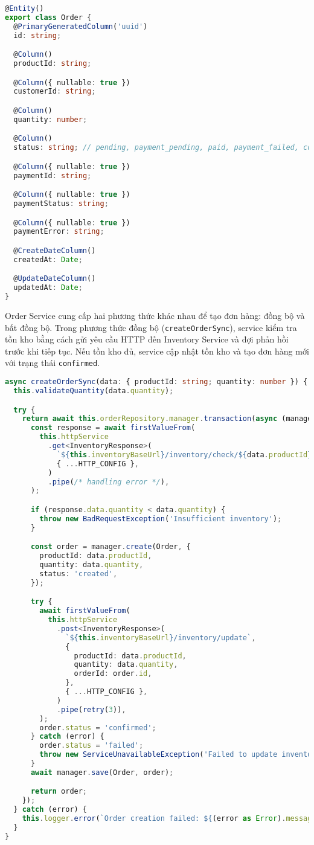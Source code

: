 \begin{lstlisting}[language=Typescript]
@Entity()
export class Order {
  @PrimaryGeneratedColumn('uuid')
  id: string;

  @Column()
  productId: string;

  @Column({ nullable: true })
  customerId: string;

  @Column()
  quantity: number;

  @Column()
  status: string; // pending, payment_pending, paid, payment_failed, completed

  @Column({ nullable: true })
  paymentId: string;

  @Column({ nullable: true })
  paymentStatus: string;

  @Column({ nullable: true })
  paymentError: string;

  @CreateDateColumn()
  createdAt: Date;

  @UpdateDateColumn()
  updatedAt: Date;
}
\end{lstlisting}

Order Service cung cấp hai phương thức khác nhau để tạo đơn hàng: đồng bộ và bất đồng bộ. Trong phương thức đồng bộ (\texttt{createOrderSync}), service kiểm tra tồn kho bằng cách gửi yêu cầu HTTP đến Inventory Service và đợi phản hồi trước khi tiếp tục. Nếu tồn kho đủ, service cập nhật tồn kho và tạo đơn hàng mới với trạng thái \texttt{confirmed}.

\begin{lstlisting}[language=Typescript]
async createOrderSync(data: { productId: string; quantity: number }) {
  this.validateQuantity(data.quantity);

  try {
    return await this.orderRepository.manager.transaction(async (manager) => {
      const response = await firstValueFrom(
        this.httpService
          .get<InventoryResponse>(
            `${this.inventoryBaseUrl}/inventory/check/${data.productId}`,
            { ...HTTP_CONFIG },
          )
          .pipe(/* handling error */),
      );

      if (response.data.quantity < data.quantity) {
        throw new BadRequestException('Insufficient inventory');
      }

      const order = manager.create(Order, {
        productId: data.productId,
        quantity: data.quantity,
        status: 'created',
      });

      try {
        await firstValueFrom(
          this.httpService
            .post<InventoryResponse>(
              `${this.inventoryBaseUrl}/inventory/update`,
              {
                productId: data.productId,
                quantity: data.quantity,
                orderId: order.id,
              },
              { ...HTTP_CONFIG },
            )
            .pipe(retry(3)),
        );
        order.status = 'confirmed';
      } catch (error) {
        order.status = 'failed';
        throw new ServiceUnavailableException('Failed to update inventory');
      }
      await manager.save(Order, order);

      return order;
    });
  } catch (error) {
    this.logger.error(`Order creation failed: ${(error as Error).message}`);
  }
}
\end{lstlisting}

